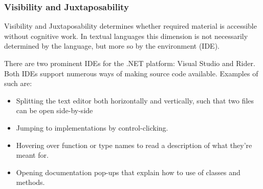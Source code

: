 \subsubsection{Visibility and Juxtaposability}
Visibility and Juxtaposability determines whether required material is accessible without cognitive work\cite{green1996usability}. In textual languages this dimension is not necessarily determined by the language, but more so by the environment (\gls{IDE}).

There are two prominent \glspl{IDE} for the .NET platform: Visual Studio and Rider. Both \glspl{IDE} support numerous ways of making source code available. Examples of such are:
\begin{itemize}
    \item Splitting the text editor both horizontally and vertically, such that two files can be open side-by-side
    \item Jumping to implementations by control-clicking.
    \item Hovering over function or type names to read a description of what they're meant for.
    \item Opening documentation pop-ups that explain how to use of classes and methods.
\end{itemize}